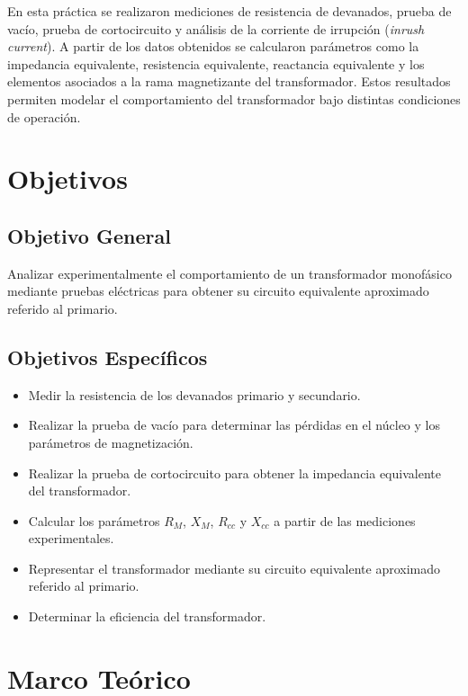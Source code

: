 \documentclass[conference]{IEEEtran}
\begin{document}
En esta práctica se realizaron mediciones de resistencia de devanados, prueba de vacío, prueba de cortocircuito y análisis de la corriente de irrupción (\textit{inrush current}). A partir de los datos obtenidos se calcularon parámetros como la impedancia equivalente, resistencia equivalente, reactancia equivalente y los elementos asociados a la rama magnetizante del transformador. Estos resultados permiten modelar el comportamiento del transformador bajo distintas condiciones de operación.

\section{Objetivos}

\subsection{Objetivo General}
Analizar experimentalmente el comportamiento de un transformador monofásico mediante pruebas eléctricas para obtener su circuito equivalente aproximado referido al primario.

\subsection{Objetivos Específicos}
\begin{itemize}
    \item Medir la resistencia de los devanados primario y secundario.

    \item Realizar la prueba de vacío para determinar las pérdidas en el núcleo y los parámetros de magnetización.

    \item Realizar la prueba de cortocircuito para obtener la impedancia equivalente del transformador.

    \item Calcular los parámetros $R_M$, $X_M$, $R_{cc}$ y $X_{cc}$ a partir de las mediciones experimentales.

    \item Representar el transformador mediante su circuito equivalente aproximado referido al primario.

    \item Determinar la eficiencia del transformador.
\end{itemize}

\section{Marco Teórico}
\end{document}
